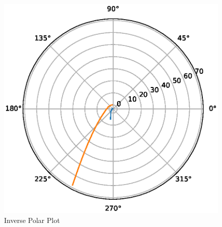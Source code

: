 %
\begin{figure}
\centering
\includegraphics[width=\columnwidth]{./figs/ee18btech11002/ee18btech11002_1.eps}
\caption{Inverse Polar Plot}
\label{fig:ee18btech11002inverse_polar_plot}
\end{figure}


